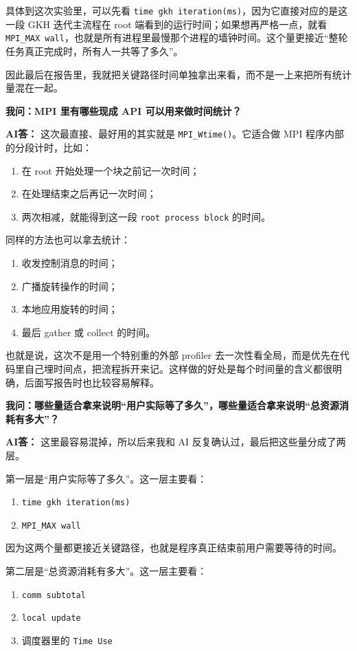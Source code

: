 \documentclass[12pt,a4paper,fontset=none]{ctexart}
\begin{document}
具体到这次实验里，可以先看 \texttt{time gkh iteration(ms)}，因为它直接对应的是这一段 GKH 迭代主流程在 root 端看到的运行时间；如果想再严格一点，就看 \texttt{MPI\_MAX wall}，也就是所有进程里最慢那个进程的墙钟时间。这个量更接近“整轮任务真正完成时，所有人一共等了多久”。

因此最后在报告里，我就把关键路径时间单独拿出来看，而不是一上来把所有统计量混在一起。

\textbf{我问：MPI 里有哪些现成 API 可以用来做时间统计？}

\textbf{AI答：} 这次最直接、最好用的其实就是 \texttt{MPI\_Wtime()}。它适合做 MPI 程序内部的分段计时，比如：
\begin{enumerate}
    \item 在 root 开始处理一个块之前记一次时间；
    \item 在处理结束之后再记一次时间；
    \item 两次相减，就能得到这一段 \texttt{root process block} 的时间。
\end{enumerate}

同样的方法也可以拿去统计：
\begin{enumerate}
    \item 收发控制消息的时间；
    \item 广播旋转操作的时间；
    \item 本地应用旋转的时间；
    \item 最后 gather 或 collect 的时间。
\end{enumerate}

也就是说，这次不是用一个特别重的外部 profiler 去一次性看全局，而是优先在代码里自己埋时间点，把流程拆开来记。这样做的好处是每个时间量的含义都很明确，后面写报告时也比较容易解释。

\textbf{我问：哪些量适合拿来说明“用户实际等了多久”，哪些量适合拿来说明“总资源消耗有多大”？}

\textbf{AI答：} 这里最容易混掉，所以后来我和 AI 反复确认过，最后把这些量分成了两层。

第一层是“用户实际等了多久”。这一层主要看：
\begin{enumerate}
    \item \texttt{time gkh iteration(ms)}
    \item \texttt{MPI\_MAX wall}
\end{enumerate}
因为这两个量都更接近关键路径，也就是程序真正结束前用户需要等待的时间。

第二层是“总资源消耗有多大”。这一层主要看：
\begin{enumerate}
    \item \texttt{comm subtotal}
    \item \texttt{local update}
    \item 调度器里的 \texttt{Time Use}
\end{enumerate}
\end{document}
